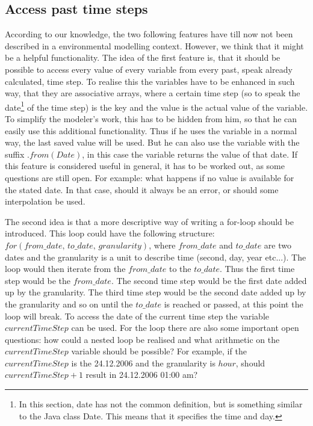 \subsection{Access past time steps}
\par
According to our knowledge, the two following features have till now not been described in a environmental modelling context. However, we think that it might be a helpful functionality.
The idea of the first feature is, that it should be possible to access every value of every variable from every past, speak already calculated, time step. To realise this the variables have to be enhanced in such way, that they are associative arrays, where a certain time step (so to speak the date\footnote{In this section, date has not the common definition, but is something similar to the Java class Date. This means that it specifies the time and day.} of the time step) is the key and the value is the actual value of the variable. To simplify the modeler’s work, this has to be hidden from him, so that he can easily use this additional functionality. Thus if he uses the variable in a normal way, the last saved value will be used. But he can also use the variable with the suffix $.from(Date)$, in this case the variable returns the value of that date. If this feature is considered useful in general, it has to be worked out, as some questions are still open. For example: what happens if no value is available for the stated date. In that case, should it always be an error, or should some interpolation be used.
\par
The second idea is that a more descriptive way of writing a for-loop should be introduced. This loop could have the following structure:\\
$for(from\_date,\, to\_date,\, granularity)$, where $from\_date$ and $to\_date$ are two dates and the granularity is a unit to describe time (second, day, year etc...). The loop would then iterate from the $from\_date$ to the $to\_date$. Thus the first time step would be the $from\_date$. The second time step would be the first date added up by the granularity. The third time step would be the second date added up by the granularity and so on until the $to\_date$ is reached or passed, at this point the loop will break. To access the date of the current time step the variable $currentTimeStep$ can be used. For the loop there are also some important  open questions: how could a nested loop be realised and what arithmetic on the $currentTimeStep$ variable should be possible? For example, if the $currentTimeStep$ is the 24.12.2006 and the granularity is $hour$, should $currentTimeStep+1$ result in 24.12.2006 01:00 am?
